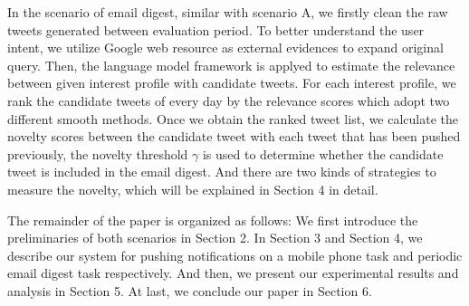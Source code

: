 In the scenario of email digest, similar with scenario A, we firstly clean the raw tweets generated between evaluation period. To better understand the user intent, we utilize Google web resource as external evidences to expand original query. Then, the language model framework is applyed to estimate the relevance between given interest profile with candidate tweets. For each interest profile, we rank the candidate tweets of every day by the relevance scores which adopt two different smooth methods. Once we obtain the ranked tweet list, we calculate the novelty scores between the candidate tweet with each tweet that has been pushed previously, the novelty threshold $\gamma$ is used to determine whether the candidate tweet is included in the email digest. And there are two kinds of strategies to measure the novelty, which will be explained in Section 4 in detail.


The remainder of the paper is organized as follows: We first introduce the preliminaries of both scenarios in Section 2. In Section 3 and Section 4, we describe our system for pushing notifications on a mobile phone task and periodic email digest task respectively. And then, we present our experimental results and analysis in Section 5. At last, we conclude our paper in Section 6.

